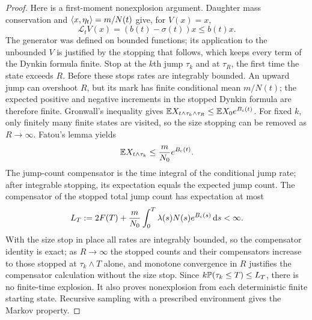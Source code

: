 \begin{proof}
Here is a first-moment nonexplosion argument. Daughter mass conservation
and $\langle x,\eta_t\rangle=m/N(t)$ give, for $V(x)=x$,
\begin{equation}
 \mathcal L_t V(x)=(b(t)-\sigma(t))x\leq b(t)x.
 \label{eq:number-lyapunov}
\end{equation}
The generator was defined on bounded functions; its application to
the unbounded $V$ is justified by the stopping that follows, which
keeps every term of the Dynkin formula finite.
Stop at the $k$th jump $\tau_k$ and at $\tau_R$, the first time
the state exceeds $R$.
Before these stops rates are integrably bounded. An upward jump can
overshoot $R$, but its mark has finite conditional mean $m/N(t)$;
the expected positive and negative increments in the stopped Dynkin
formula are therefore finite. Gronwall's inequality gives
$\mathbb E X_{t\wedge\tau_k\wedge\tau_R}\leq\mathbb E X_0e^{B_{\mathrm c}(t)}$.
For fixed $k$, only finitely many finite states are visited, so the
size stopping can be removed as $R\to\infty$. Fatou's lemma yields
\begin{equation}
 \mathbb E X_{t\wedge\tau_k}\leq\frac m{N_0}e^{B_{\mathrm c}(t)}.
 \label{eq:stopped-first-moment}
\end{equation}
The jump-count compensator is the time integral of the conditional
jump rate; after integrable stopping, its expectation equals the
expected jump count. The compensator of the stopped total jump count has
expectation at most
\begin{equation}
 L_T:=2F(T)+\frac m{N_0}
       \int_0^T\lambda(s)N(s)e^{B_{\mathrm c}(s)}\,\mathrm d s<\infty.
 \label{eq:stopped-jump-bound}
\end{equation}
With the size stop in place all rates are integrably bounded, so
the compensator identity is exact; as $R\to\infty$ the stopped
counts and their compensators increase to those stopped at
$\tau_k\wedge T$ alone, and monotone convergence in $R$ justifies
the compensator calculation without the size stop. Since
$k\mathbb P(\tau_k\leq T)\leq L_T$, there is no finite-time explosion.
It also proves nonexplosion from each deterministic finite starting
state. Recursive sampling with a prescribed environment gives the
Markov property.


\end{proof}
